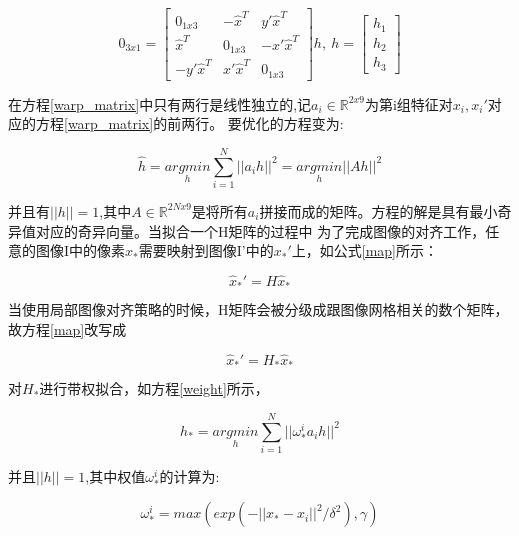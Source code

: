 \begin{center}
  \begin{equation}\label{warp_matrix}
    0_{3x1}=\begin{bmatrix}
              0_{1x3} & -\hat{x}^T & y'\hat{x}^T \\
              \hat{x}^T & 0_{1x3} & -x'\hat{x}^T \\
              -y'\hat{x}^T & x'\hat{x}^T  & 0_{1x3}
            \end{bmatrix}h ,~h=\begin{bmatrix}
                               h_1 \\
                               h_2 \\
                               h_3
                             \end{bmatrix}
  \end{equation}
  \end{center}





在方程\ref{warp_matrix}中只有两行是线性独立的,记$a_i\in{\mathbb{R}^{2x9}}$为第i组特征对${x_i,x_i'}$对应的方程\ref{warp_matrix}的前两行。
要优化的方程变为:
    \begin{center}
      \begin{equation}\label{h}
        \hat{h}=\underset{h}{argmin}\sum_{i=1}^{N}||a_ih||^2=\underset{h}{argmin}||Ah||^2
      \end{equation}
    \end{center}
并且有$||h||=1$,其中$A\in \mathbb{R}^{2Nx9}$是将所有$a_i$拼接而成的矩阵。方程的解是具有最小奇异值对应的奇异向量。当拟合一个H矩阵的过程中
为了完成图像的对齐工作，任意的图像I中的像素$x_*$需要映射到图像I'中的$x_*'$上，如公式\ref{map}所示：
\begin{center}
  \begin{equation}\label{map}
  \hat{x}_*'=H\hat{x}_*
\end{equation}
\end{center}

当使用局部图像对齐策略的时候，H矩阵会被分级成跟图像网格相关的数个矩阵，故方程\ref{map}改写成
\begin{center}
\begin{equation}\label{local_map}
  \hat{x}_*'=H_*\hat{x}_*
\end{equation}
\end{center}
对$H_*$进行带权拟合，如方程\ref{weight}所示，
\begin{center}
  \begin{equation}\label{weight}
    h_*=\underset{h}{argmin}\sum_{i=1}^{N}||\omega_*^ia_ih||^2
  \end{equation}
\end{center}
并且$||h||=1$,其中权值$\omega_*^i$的计算为:
\begin{center}
  \begin{equation}\label{omega}
    \omega_*^i=max(exp(-||x_*-x_i||^2/\delta^2),\gamma)
  \end{equation}
\end{center}


